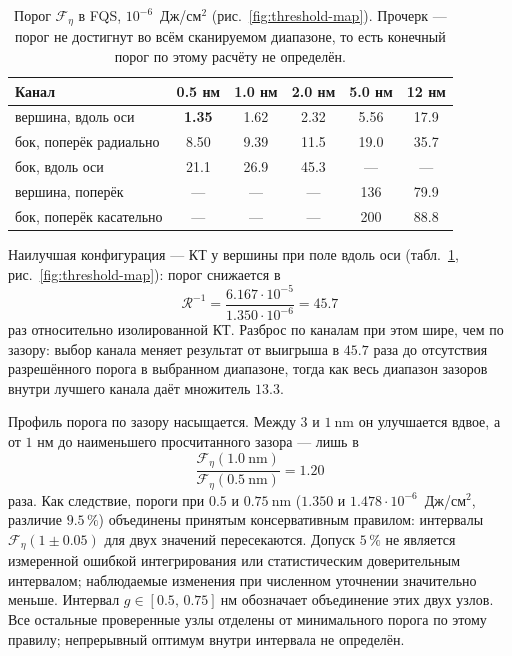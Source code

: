 \begin{table}[t]
  \centering
  \caption{Порог $\mathcal F_\eta$ в FQS, $10^{-6}$~Дж/см$^2$
  (рис.~\ref{fig:threshold-map}). Прочерк — порог не достигнут во всём сканируемом диапазоне, то
  есть конечный порог по этому расчёту не определён.}
  \label{tab:thresholds}
  \small
  \begin{tabular}{lccccc}
    \toprule
    Канал & 0.5 нм & 1.0 нм & 2.0 нм & 5.0 нм & 12 нм \\
    \midrule
    вершина, вдоль оси          & \textbf{1.35} & 1.62 & 2.32 & 5.56 & 17.9 \\
    бок, поперёк радиально      & 8.50 & 9.39 & 11.5 & 19.0 & 35.7 \\
    бок, вдоль оси              & 21.1 & 26.9 & 45.3 & ---  & ---  \\
    вершина, поперёк            & ---  & ---  & ---  & 136  & 79.9 \\
    бок, поперёк касательно     & ---  & ---  & ---  & 200  & 88.8 \\
    \bottomrule
  \end{tabular}
\end{table}

Наилучшая конфигурация — КТ у вершины при поле вдоль оси
(табл.~\ref{tab:thresholds}, рис.~\ref{fig:threshold-map}): порог снижается в
\begin{equation}
  \mathcal{R}^{-1} = \frac{6.167\cdot10^{-5}}{1.350\cdot10^{-6}} = 45.7
  \label{eq:best-ratio}
\end{equation}
раз относительно изолированной КТ. Разброс по каналам при этом шире, чем по
зазору: выбор канала меняет результат от выигрыша в $45.7$ раза до отсутствия
разрешённого порога в выбранном диапазоне, тогда как весь диапазон зазоров
внутри лучшего канала даёт
множитель $13.3$.

Профиль порога по зазору насыщается. Между $3$ и $\SI{1}{\nano\meter}$ он
улучшается вдвое, а от $1$ нм до наименьшего просчитанного зазора — лишь в
\begin{equation}
  \frac{\mathcal F_\eta(\SI{1.0}{\nano\meter})}{\mathcal F_\eta(\SI{0.5}{\nano\meter})}
  = 1.20
  \label{eq:saturation}
\end{equation}
раза. Как следствие, пороги при $0.5$ и $\SI{0.75}{\nano\meter}$
($1.350$ и $1.478\cdot10^{-6}$~Дж/см$^2$, различие $9.5\,\%$) объединены
принятым консервативным правилом: интервалы $\mathcal F_\eta(1\pm0.05)$
для двух значений пересекаются. Допуск $5\,\%$ не является измеренной
ошибкой интегрирования или статистическим доверительным интервалом;
наблюдаемые изменения при численном уточнении значительно меньше.
Интервал $g\in[0.5,\,0.75]\ \text{нм}$ обозначает объединение этих двух
узлов. Все остальные проверенные узлы отделены от минимального порога
по этому правилу; непрерывный оптимум внутри интервала не определён.

